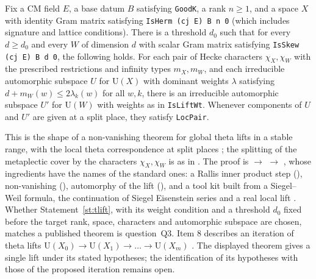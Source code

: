 \begin{statement}\label{st:tlift}
Fix a CM field $E$, a base datum $B$ satisfying \texttt{GoodK}, a rank $n\ge1$, and a space $X$ with
identity Gram matrix satisfying \texttt{IsHerm (cj E) B n 0} (which includes signature and lattice
conditions). There is a threshold $d_0$ such that for every $d\ge d_0$ and every $W$ of dimension $d$
with scalar Gram matrix satisfying \texttt{IsSkew (cj E) B d 0}, the following holds. For each pair
of Hecke characters $\chi_X,\chi_W$ with the prescribed restrictions and infinity types $m_X,m_W$,
and each irreducible automorphic subspace $U$ for $\mathrm U(X)$ with dominant weights $\lambda$
satisfying $d+m_W(w)\le2\lambda_k(w)$ for all $w,k$, there is an irreducible automorphic subspace
$U'$ for $\mathrm U(W)$ with weights as in \texttt{IsLiftWt}. Whenever components of $U$ and $U'$
are given at a split place, they satisfy \texttt{LocPair}.
\end{statement}

\noindent This is the shape of a non-vanishing theorem for global theta lifts in a stable range,
with the local theta correspondence at split places  \sti; the
splitting of the metaplectic cover by the characters $\chi_X,\chi_W$ is as in \cite{kudla-splitting}.
The proof is 
$\to$  $\to$ 
,
whose ingredients have the names of the standard ones: a Rallis inner product step
(), non-vanishing (), automorphy of the
lift (), and a tool kit
built from a Siegel--Weil formula, the continuation of Siegel Eisenstein series and a real local
lift . Whether Statement~\ref{st:tlift}, with its weight condition and
a threshold $d_0$ fixed before the target rank, space, characters and automorphic subspace are
chosen, matches a published theorem is question~Q3. Item 8 describes an iteration of theta lifts
$\mathrm U(X_0)\to\mathrm U(X_1)\to\dots\to\mathrm U(X_m)$ . The displayed theorem gives a
single lift under its stated hypotheses; the identification of its hypotheses with those of the
proposed iteration remains open.

